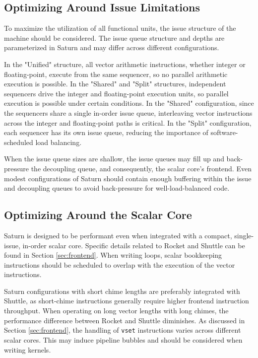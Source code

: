 \subsection{Optimizing Around Issue Limitations}

To maximize the utilization of all functional units, the issue structure of the machine should be considered.
The issue queue structure and depths are parameterized in Saturn and may differ across different configurations.

In the "Unified" structure, all vector arithmetic instructions, whether integer or floating-point, execute from the same sequencer, so no parallel arithmetic execution is possible.
In the "Shared" and "Split" structures, independent sequencers drive the integer and floating-point execution units, so parallel execution is possible under certain conditions.
In the "Shared" configuration, since the sequencers share a single in-order issue queue, interleaving vector instructions across the integer and floating-point paths is critical.
In the "Split" configuration, each sequencer has its own issue queue, reducing the importance of software-scheduled load balancing.

When the issue queue sizes are shallow, the issue queues may fill up and back-pressure the decoupling queue, and consequently, the scalar core's frontend.
Even modest configurations of Saturn should contain enough buffering within the issue and decoupling queues to avoid back-pressure for well-load-balanced code.


\subsection{Optimizing Around the Scalar Core}

Saturn is designed to be performant even when integrated with a compact, single-issue, in-order scalar core.
Specific details related to Rocket and Shuttle can be found in Section \ref{sec:frontend}.
When writing loops, scalar bookkeeping instructions should be scheduled to overlap with the execution of the vector instructions.

Saturn configurations with short chime lengths are preferably integrated with Shuttle, as short-chime instructions generally require higher frontend instruction throughput.
When operating on long vector lengths with long chimes, the performance difference between Rocket and Shuttle diminishes.
As discussed in Section \ref{sec:frontend}, the handling of \texttt{vset} instructions varies across different scalar cores.
This may induce pipeline bubbles and should be considered when writing kernels.  

